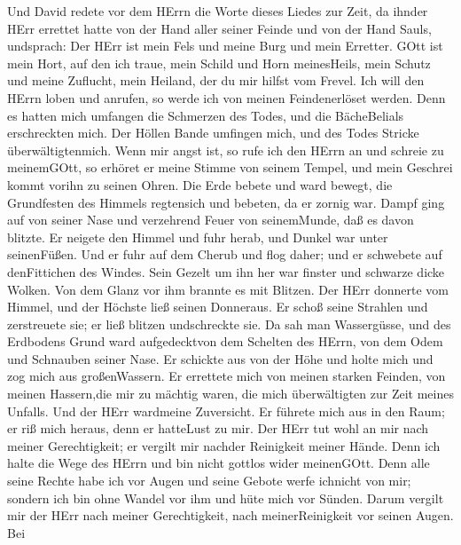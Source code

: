  Und David redete vor dem HErrn die Worte dieses Liedes zur
Zeit, da ihnder HErr errettet hatte von der Hand aller seiner Feinde und
von der Hand Sauls, undsprach:  Der HErr ist mein Fels und
meine Burg und mein Erretter.  GOtt ist mein Hort, auf den
ich traue, mein Schild und Horn meinesHeils, mein Schutz und meine
Zuflucht, mein Heiland, der du mir hilfst vom Frevel.  Ich
will den HErrn loben und anrufen, so werde ich von meinen Feindenerlöset
werden.  Denn es hatten mich umfangen die Schmerzen des
Todes, und die BächeBelials erschreckten mich.  Der Höllen
Bande umfingen mich, und des Todes Stricke überwältigtenmich.
 Wenn mir angst ist, so rufe ich den HErrn an und schreie zu
meinemGOtt, so erhöret er meine Stimme von seinem Tempel, und mein
Geschrei kommt vorihn zu seinen Ohren.  Die Erde bebete und
ward bewegt, die Grundfesten des Himmels regtensich und bebeten, da er
zornig war.  Dampf ging auf von seiner Nase und verzehrend
Feuer von seinemMunde, daß es davon blitzte.  Er neigete
den Himmel und fuhr herab, und Dunkel war unter seinenFüßen.
 Und er fuhr auf dem Cherub und flog daher; und er
schwebete auf denFittichen des Windes.  Sein Gezelt um ihn
her war finster und schwarze dicke Wolken.  Von dem Glanz
vor ihm brannte es mit Blitzen.  Der HErr donnerte vom
Himmel, und der Höchste ließ seinen Donneraus.  Er schoß
seine Strahlen und zerstreuete sie; er ließ blitzen undschreckte sie.
 Da sah man Wassergüsse, und des Erdbodens Grund ward
aufgedecktvon dem Schelten des HErrn, von dem Odem und Schnauben seiner
Nase.  Er schickte aus von der Höhe und holte mich und zog
mich aus großenWassern.  Er errettete mich von meinen
starken Feinden, von meinen Hassern,die mir zu mächtig waren,
 die mich überwältigten zur Zeit meines Unfalls. Und der
HErr wardmeine Zuversicht.  Er führete mich aus in den
Raum; er riß mich heraus, denn er hatteLust zu mir.  Der
HErr tut wohl an mir nach meiner Gerechtigkeit; er vergilt mir nachder
Reinigkeit meiner Hände.  Denn ich halte die Wege des HErrn
und bin nicht gottlos wider meinenGOtt.  Denn alle seine
Rechte habe ich vor Augen und seine Gebote werfe ichnicht von mir;
 sondern ich bin ohne Wandel vor ihm und hüte mich vor
Sünden.  Darum vergilt mir der HErr nach meiner
Gerechtigkeit, nach meinerReinigkeit vor seinen Augen.  Bei
